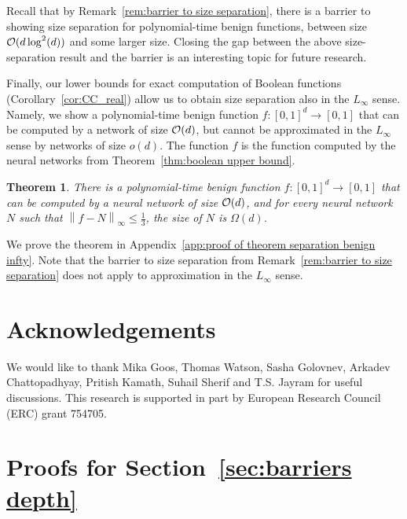 \documentclass[11pt]{article}
\newtheorem{theorem}{Theorem}[section]
\newcommand{\co}{{\cal O}}
\newcommand{\norm}[1]{\left\|#1\right\|}
\begin{document}
Recall that by Remark~\ref{rem:barrier to size separation}, there is a barrier to showing size separation for polynomial-time benign functions, between size $\co(d \log^2(d))$ and some larger size. Closing the gap between the above size-separation result and the barrier is an interesting topic for future research.

Finally, our lower bounds for exact computation of Boolean functions (Corollary~\ref{cor:CC_real}) allow us to obtain size separation also in the $L_\infty$ sense. Namely, we show a polynomial-time benign function $f:[0,1]^d \rightarrow [0,1]$ that can be computed by a network of size $\co(d)$, but cannot be approximated in the $L_\infty$ sense by networks of size $o(d)$. The function $f$ is the function computed by the neural networks from Theorem~\ref{thm:boolean upper bound}. 

\begin{theorem}
\label{thm:separation benign infty}
    There is a polynomial-time benign function $f:[0,1]^d \rightarrow [0,1]$ that can be computed by a neural network of size $\co(d)$, and for every neural network $N$ such that $\norm{f-N}_\infty \leq \frac{1}{3}$, the size of $N$ is $\Omega(d)$. 
\end{theorem}

We prove the theorem in Appendix~\ref{app:proof of theorem separation benign infty}.
Note that the barrier to size separation from Remark~\ref{rem:barrier to size separation} does not apply to approximation in the $L_\infty$ sense. 

\section*{Acknowledgements}

We would like to thank Mika Goos, Thomas Watson, Sasha Golovnev,
Arkadev Chattopadhyay, Pritish Kamath, Suhail Sherif and T.S. Jayram for useful discussions. 
This research is supported in part by European Research Council (ERC) grant 754705.




\appendix

\section{Proofs for Section~\ref{sec:barriers depth}}

\end{document}
